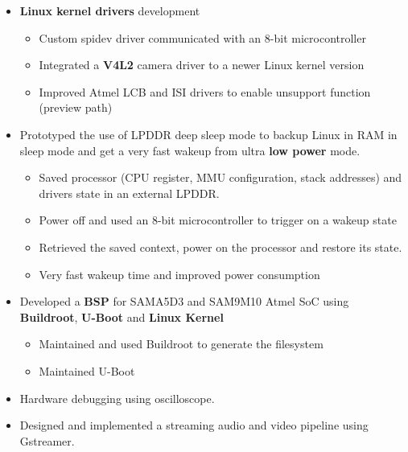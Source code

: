 \documentclass[10pt,a4paper]{altacv}
\begin{document}
\begin{paracol}{2}
\divider

\begin{itemize}
\item \textbf{\textcolor{bold}{Linux kernel drivers}} development
\begin{itemize}
    \renewcommand{\labelitemii}{-} %
    \item Custom spidev driver communicated with an 8-bit microcontroller
    \item Integrated a \textbf{\textcolor{bold}{V4L2}} camera driver to a newer Linux kernel version
    \item Improved Atmel LCB and ISI drivers to enable unsupport function (preview path)
\end{itemize}
\item Prototyped the use of LPDDR deep sleep mode to backup Linux in RAM in sleep mode and get a very fast wakeup from ultra \textbf{\textcolor{bold}{low power}} mode.
\begin{itemize}
    \renewcommand{\labelitemii}{-} %
    \item Saved processor (CPU register, MMU configuration, stack addresses) and drivers state in an external LPDDR.
    \item Power off and used an 8-bit microcontroller to trigger on a wakeup state
    \item Retrieved the saved context, power on the processor and restore its state.
    \item Very fast wakeup time and improved power consumption
\end{itemize}
\item Developed a \textbf{\textcolor{bold}{BSP}} for SAMA5D3 and SAM9M10 Atmel SoC using \textbf{\textcolor{bold}{Buildroot}}, \textbf{\textcolor{bold}{U-Boot}} and \textbf{\textcolor{bold}{Linux  Kernel}}
\begin{itemize}
    \renewcommand{\labelitemii}{-} %
    \item Maintained and used Buildroot to generate the filesystem
    \item Maintained U-Boot
\end{itemize}
\item Hardware debugging using oscilloscope.
\item Designed and implemented a streaming audio and video pipeline using Gstreamer.
\end{itemize}


\end{paracol}
\end{document}
